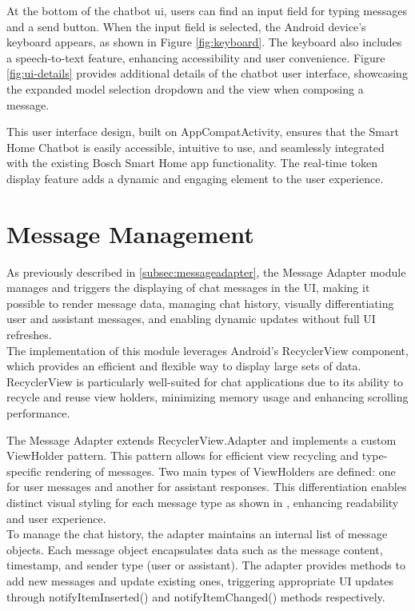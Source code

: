 At the bottom of the chatbot \gls{ui}, users can find an input field for typing messages and a send button. When the input field is selected, the Android device's keyboard appears, as shown in Figure \ref{fig:keyboard}. The keyboard also includes a speech-to-text feature, enhancing accessibility and user convenience.
Figure \ref{fig:ui-details} provides additional details of the chatbot user interface, showcasing the expanded model selection dropdown and the view when composing a message.

This user interface design, built on AppCompatActivity, ensures that the Smart Home Chatbot is easily accessible, intuitive to use, and seamlessly integrated with the existing Bosch Smart Home app functionality. The real-time token display feature adds a dynamic and engaging element to the user experience.

\section{Message Management}
As previously described in \cref{subsec:messageadapter}, the Message Adapter module manages and triggers the displaying of chat messages in the UI, making it possible to render message data, managing chat history, visually differentiating user and assistant messages, and enabling dynamic updates without full UI refreshes. \\
The implementation of this module leverages Android's RecyclerView component, which provides an efficient and flexible way to display large sets of data. RecyclerView is particularly well-suited for chat applications due to its ability to recycle and reuse view holders, minimizing memory usage and enhancing scrolling performance.


The Message Adapter extends RecyclerView.Adapter and implements a custom ViewHolder pattern. This pattern allows for efficient view recycling and type-specific rendering of messages. Two main types of ViewHolders are defined: one for user messages and another for assistant responses. This differentiation enables distinct visual styling for each message type as shown in , enhancing readability and user experience.\\
To manage the chat history, the adapter maintains an internal list of message objects. Each message object encapsulates data such as the message content, timestamp, and sender type (user or assistant). The adapter provides methods to add new messages and update existing ones, triggering appropriate UI updates through notifyItemInserted() and notifyItemChanged() methods respectively.

